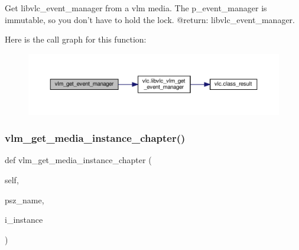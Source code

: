 \begin{DoxyVerb}Get libvlc_event_manager from a vlm media.
The p_event_manager is immutable, so you don't have to hold the lock.
@return: libvlc_event_manager.
\end{DoxyVerb}
 Here is the call graph for this function\+:
\nopagebreak
\begin{figure}[H]
\begin{center}
\leavevmode
\includegraphics[width=350pt]{classvlc_1_1_instance_a1eb24fac1f012e58b9baf7dcb0676588_cgraph}
\end{center}
\end{figure}
\mbox{\label{classvlc_1_1_instance_ae060ff32b135cd2bf8990ad5fafc6143}} 
\subsubsection{\texorpdfstring{vlm\+\_\+get\+\_\+media\+\_\+instance\+\_\+chapter()}{vlm\_get\_media\_instance\_chapter()}}
{\footnotesize\ttfamily def vlm\+\_\+get\+\_\+media\+\_\+instance\+\_\+chapter (\begin{DoxyParamCaption}\item[{}]{self,  }\item[{}]{psz\+\_\+name,  }\item[{}]{i\+\_\+instance }\end{DoxyParamCaption})}

